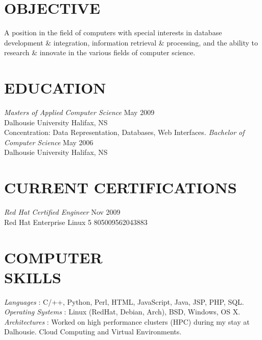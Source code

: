 \documentclass[line,margin]{res}
\begin{document}
\address{3139 Veith Street, Halifax, NS B3K 3G9}
\address{(902) 800-5288}


\begin{resume}

\section{OBJECTIVE}
    A position in the field of computers with special
    interests in database development {\&} integration,
    information retrieval {\&} processing, and the ability to
    research {\&} innovate in the various fields of computer
    science.


\section{EDUCATION}
    {\sl Masters of Applied Computer Science} \hfill May 2009\\
        Dalhousie University \hfill Halifax, NS\\
        Concentration: Data Representation, Databases,
        Web Interfaces.  \medskip
    \newline
    {\sl Bachelor of Computer Science} \hfill May 2006\\
        Dalhousie University \hfill Halifax, NS

\section{CURRENT CERTIFICATIONS}
    {\sl Red Hat Certified Engineer} \hfill Nov 2009\\
        Red Hat Enterprise Linux 5 \hfill 805009562043883\\

\section{COMPUTER \\ SKILLS}
    {\sl Languages \hspace{35pt}}:
     C/++, Python, Perl, HTML, JavaScript, Java, JSP, PHP, SQL.\\
    {\sl Operating Systems }:
     Linux (RedHat, Debian, Arch), BSD, Windows, OS X. \\
    {\sl Architectures \hspace{27pt}}:
     Worked on high performance clusters (HPC) during my stay at \\
     \hspace*{92pt} Dalhousie. Cloud Computing and Virtual Environments.


\end{resume}
\end{document}
